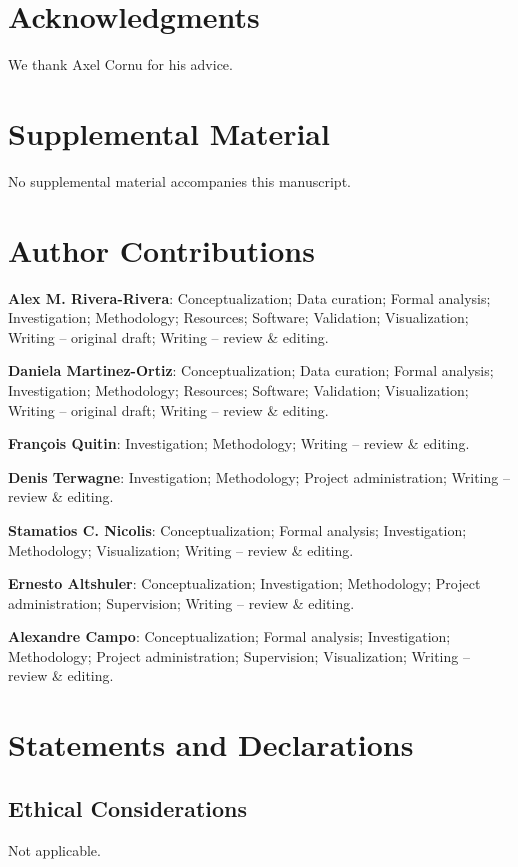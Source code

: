\section*{Acknowledgments}
We thank Axel Cornu for his advice.

\section*{Supplemental Material}
No supplemental material accompanies this manuscript.

\section*{Author Contributions}
\textbf{Alex M. Rivera-Rivera}: Conceptualization; Data curation; Formal analysis; Investigation; Methodology; Resources; Software; Validation; Visualization; Writing -- original draft; Writing -- review \& editing.

\textbf{Daniela Martinez-Ortiz}: Conceptualization; Data curation; Formal analysis; Investigation; Methodology; Resources; Software; Validation; Visualization; Writing -- original draft; Writing -- review \& editing.

\textbf{Fran\c{c}ois Quitin}: Investigation; Methodology; Writing -- review \& editing.

\textbf{Denis Terwagne}: Investigation; Methodology; Project administration; Writing -- review \& editing.

\textbf{Stamatios C. Nicolis}: Conceptualization; Formal analysis; Investigation; Methodology; Visualization; Writing -- review \& editing.

\textbf{Ernesto Altshuler}: Conceptualization; Investigation; Methodology; Project administration; Supervision; Writing -- review \& editing.

\textbf{Alexandre Campo}: Conceptualization; Formal analysis; Investigation; Methodology; Project administration; Supervision; Visualization; Writing -- review \& editing.

\section*{Statements and Declarations}

\subsection*{Ethical Considerations}
Not applicable.

